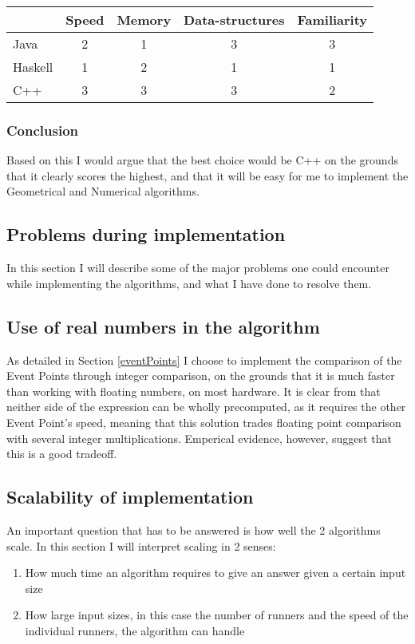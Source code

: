 \begin{tabular}{l|c|c|c|c}
        & Speed & Memory & Data-structures & Familiarity \\
\hline
Java    & 2     &  1     &  3              &   3  \\
Haskell & 1     &  2     &  1              &   1  \\
C++     & 3     &  3     &  3              &   2  \\
\end{tabular}

\subsubsection{Conclusion}
Based on this I would argue that the best choice would be C++ on the grounds that it clearly scores the highest, and that it will be easy for me to implement the Geometrical and Numerical algorithms.

\subsection{Problems during implementation}
In this section I will describe some of the major problems one could encounter while implementing the algorithms, and what I have done to resolve them.

\subsection{Use of real numbers in the algorithm}
As detailed in Section \ref{eventPoints} I choose to implement the comparison of the Event Points through integer comparison, on the grounds that it is much faster than working with floating numbers, on most hardware. It is clear from  that neither side of the expression can be wholly precomputed, as it requires the other Event Point's speed, meaning that this solution trades floating point comparison with several integer multiplications. Emperical evidence, however, suggest that this is a good tradeoff.

\subsection{Scalability of implementation}
\label{scale}
An important question that has to be answered is how well the 2 algorithms scale. In this section I will interpret scaling in 2 senses:
\begin{enumerate}
\item How much time an algorithm requires to give an answer given a certain input size
\item How large input sizes, in this case the number of runners and the speed of the individual runners, the algorithm can handle
\end{enumerate}

